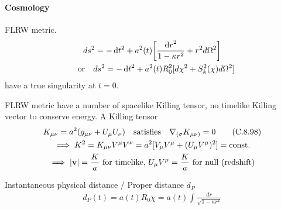 \documentclass[main]{subfiles}
\begin{document}
\begin{multicols}{2}

\paragraph{Cosmology}
    FLRW metric.
    \begin{gather}
        ds^2 = -\dd{t}^2 + a^2(t)\qty[\frac{\dd{r}^2}{1 - \kappa r^2} + r^2 d\Omega^2]
        \\
        \qq{or} ds^2 = -\dd{t}^2 + a^2(t)R_0^2[d\chi^2 + S_k^2(\chi) d\Omega^2]
    \end{gather}
    have a true singularity at $t=0$. 
    
    FLRW metric have a number of spacelike Killing tensor, no timelike Killing vector to conserve energy. A Killing tensor
    \begin{gather}
        K_{\mu\nu} = a^2(g_{\mu\nu} + U_\mu U_\nu) \qq{satisfies} \nabla_{(\sigma}K_{\mu\nu)}=0
        \tag{C.8.98}
        \\
        \implies K^2 = K_{\mu\nu} V^\mu V^\nu = a^2[V_\mu V^\mu + (U_\mu V^\mu)^2] = \text{const.}
        \\
        \implies |\vb{v}| = \frac{K}{a} \text{ for timelike},\,
        U_\mu V^\mu = \frac{K}{a} \text{ for null (redshift)}
    \end{gather}

    Instantaneous physical distance / Proper distance $d_P$
    \begin{align}
        d_P(t) = a(t)R_0\chi = a(t) \int \frac{d r}{\sqrt{1 - \kappa r^2}}
    \end{align}

    
\end{multicols}
\end{document}
